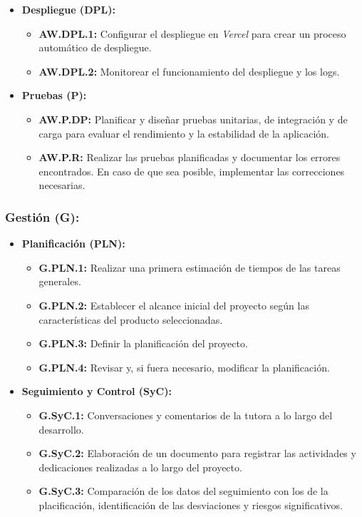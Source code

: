 \begin{itemize}
    \item \textbf{Despliegue (DPL):}
          \begin{itemize}
              \item \textbf{AW.DPL.1:} Configurar el despliegue en \textit{Vercel} para crear un proceso automático de despliegue.
              \item \textbf{AW.DPL.2:} Monitorear el funcionamiento del despliegue y los logs.
          \end{itemize}

    \item \textbf{Pruebas (P):}
          \begin{itemize}
              \item \textbf{AW.P.DP:} Planificar y diseñar pruebas unitarias, de integración y de carga para evaluar el rendimiento y la estabilidad de la aplicación.
              \item \textbf{AW.P.R:} Realizar las pruebas planificadas y documentar los errores encontrados. En caso de que sea posible, implementar las correcciones necesarias.
          \end{itemize}
\end{itemize}

\subsubsection{Gestión (G):}

\begin{itemize}
    \item \textbf{Planificación (PLN):}
          \begin{itemize}
              \item \textbf{G.PLN.1:} Realizar una primera estimación de tiempos de las tareas generales.
              \item \textbf{G.PLN.2:} Establecer el alcance inicial del proyecto según las características del producto seleccionadas.
              \item \textbf{G.PLN.3:} Definir la planificación del proyecto.
              \item \textbf{G.PLN.4:} Revisar y, si fuera necesario, modificar la planificación.
          \end{itemize}
    \item \textbf{Seguimiento y Control (SyC):}
          \begin{itemize}
              \item \textbf{G.SyC.1:} Conversaciones y comentarios de la tutora a lo largo del desarrollo.
              \item \textbf{G.SyC.2:} Elaboración de un documento para registrar las actividades y dedicaciones realizadas a lo largo del proyecto.
              \item \textbf{G.SyC.3:} Comparación de los datos del seguimiento con los de la placificación, identificación de las desviaciones y riesgos significativos.
          \end{itemize}
\end{itemize}


